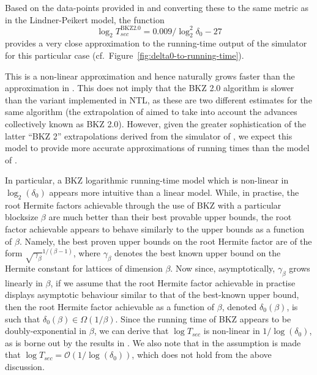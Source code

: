 Based on the data-points provided in \cite{DBLP:conf/ctrsa/LiuN13} and converting these to the same metric as in the Lindner-Peikert model, the function
$$\log_2 T_{sec}^{\text{BKZ} 2.0} = 0.009/\log_2^2\delta_0-27$$
provides a very close approximation to the running-time output of the simulator for this particular case (cf.\ Figure~\ref{fig:delta0-to-running-time}).

This is a non-linear approximation and hence naturally grows faster than the approximation in \cite{LindnerP10}. This does not imply that the BKZ 2.0 algorithm is slower than the variant implemented in NTL, as these are two different estimates for the same algorithm (the extrapolation of \cite{LindnerP10} aimed to take into account the advances collectively known as BKZ 2.0). However, given the greater sophistication of the latter ``BKZ 2'' extrapolations derived from the simulator of \cite{chen-nguyen:asiacrypt2011}, we expect this model to provide more accurate approximations of running times than the model of \cite{LindnerP10}.

In particular, a BKZ logarithmic running-time model which is non-linear in $\log_2(\delta_0)$ appears more intuitive than a linear model. While, in practise, the root Hermite factors achievable through the use of BKZ with a particular blocksize $\beta$ are much better than their best provable upper bounds, the root factor achievable appears to behave similarly to the upper bounds as a function of $\beta$. Namely, the best proven upper bounds on the root Hermite factor are of the form $\sqrt{\gamma_{\beta}}^{1/(\beta-1)}$, where $\gamma_{\beta}$ denotes the best known upper bound on the Hermite constant for lattices of dimension $\beta$. Now since, asymptotically, $\gamma_{\beta}$ grows linearly in $\beta$, if we assume that the root Hermite factor achievable in practise displays asymptotic behaviour similar to that of the best-known upper bound, then the root Hermite factor achievable as a function of $\beta$, denoted $\delta_0(\beta)$, is such that $\delta_0(\beta)\in\Omega(1/\beta)$. Since the running time of BKZ appears to be doubly-exponential in $\beta$, we can derive that $\log T_{sec}$ is non-linear in $1/\log(\delta_0)$, as is borne out by the results in \cite{DBLP:conf/ctrsa/LiuN13}. We also note that in \cite{LindnerP10} the assumption is made that $\log T_{sec}=\mathcal{O}(1/\log(\delta_0))$, which does not hold from the above discussion.

